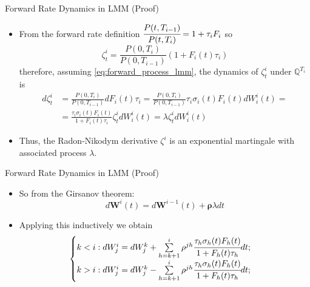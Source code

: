 \documentclass{beamer}
\begin{document}
\begin{frame}{Forward Rate Dynamics in LMM (Proof)}
  \begin{itemize}
  \item<1-> From the forward rate definition $\cfrac{P(t,T_{i-1})}{P(t,T_i)} = 1 + \tau_i F_i$ so
    \begin{equation*}
      \zeta^i_t = \frac{P(0, T_i)}{P(0, T_{i-1})}(1+F_i(t)\tau_i)
    \end{equation*}
    therefore, assuming \cref{eq:forward_process_lmm}, the dynamics of $\zeta^i_t$ under $\mathbb{Q}^{T_i}$ is
    \begin{equation*}
      \begin{aligned}
	d\zeta^i_t &= \frac{P(0, T_i)}{P(0, T_{i-1})}dF_i(t)\tau_i = \frac{P(0, T_i)}{P(0, T_{i-1})}\tau_i\sigma_i(t)F_i(t)dW^i_i(t) = \\ &= \frac{\tau_i\sigma_i(t)F_i(t)}{1+F_i(t)\tau_i}\zeta_t^idW^i_i(t)=\lambda \zeta_t^idW^i_i(t)
      \end{aligned}
    \end{equation*}
  \item<2-> Thus, the Radon-Nikodym derivative $\zeta^i$ is an exponential martingale with associated process $\lambda$. %
  \end{itemize}
\end{frame}

\begin{frame}{Forward Rate Dynamics in LMM (Proof)}
  \begin{itemize}
  \item<1-> So from the Girsanov theorem:
    \begin{equation*}
      d\bm{W}^i(t) = d\bm{W}^{i-1}(t)+\bm{\rho}\lambda dt 
    \end{equation*}
  \item<2-> Applying this inductively we obtain
    \begin{equation*}
  	\begin{cases}
	k < i : dW^i_j = dW^k_j + \sum\limits_{h=k+1}^i \rho^{jh}\cfrac{\tau_h\sigma_h(t)F_h(t)}{1+F_h(t)\tau_h} dt;\\
	k > i : dW^i_j = dW^k_j - \sum\limits_{h=k+1}^i \rho^{jh}\cfrac{\tau_h\sigma_h(t)F_h(t)}{1+F_h(t)\tau_h} dt;\\
  	\end{cases}
    \end{equation*}
  \end{itemize}
\end{frame}
\end{document}
